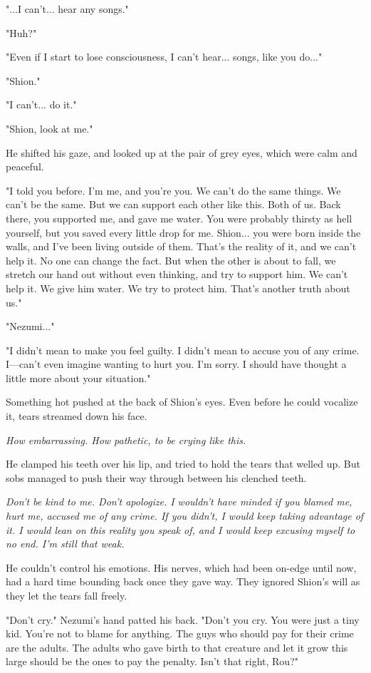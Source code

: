 "...I can't... hear any songs."

"Huh?"

"Even if I start to lose consciousness, I can't hear... songs, like you
do..."

"Shion."

"I can't... do it."

"Shion, look at me."

He shifted his gaze, and looked up at the pair of grey eyes, which were
calm and peaceful.

"I told you before. I'm me, and you're you. We can't do the same things.
We can't be the same. But we can support each other like this. Both of
us. Back there, you supported me, and gave me water. You were probably
thirsty as hell yourself, but you saved every little drop for me.
Shion... you were born inside the walls, and I've been living outside of
them. That's the reality of it, and we can't help it. No one can change
the fact. But when the other is about to fall, we stretch our hand out
without even thinking, and try to support him. We can't help it. We give
him water. We try to protect him. That's another truth about us."

"Nezumi..."

"I didn't mean to make you feel guilty. I didn't mean to accuse you of
any crime. I---can't even imagine wanting to hurt you. I'm sorry. I should
have thought a little more about your situation."

Something hot pushed at the back of Shion's eyes. Even before he could
vocalize it, tears streamed down his face.

\emph{How embarrassing. How pathetic, to be crying like this.}

He clamped his teeth over his lip, and tried to hold the tears that
welled up. But sobs managed to push their way through between his
clenched teeth.

\emph{Don't be kind to me. Don't apologize. I wouldn't have minded if you
blamed me, hurt me, accused me of any crime. If you didn't, I would keep
taking advantage of it. I would lean on this reality you speak of, and I
would keep excusing myself to no end. I'm still that weak.}

He couldn't control his emotions. His nerves, which had been on-edge
until now, had a hard time bounding back once they gave way. They
ignored Shion's will as they let the tears fall freely.

"Don't cry." Nezumi's hand patted his back. "Don't you cry. You were
just a tiny kid. You're not to blame for anything. The guys who should
pay for their crime are the adults. The adults who gave birth to that
creature and let it grow this large should be the ones to pay the
penalty. Isn't that right, Rou?"

